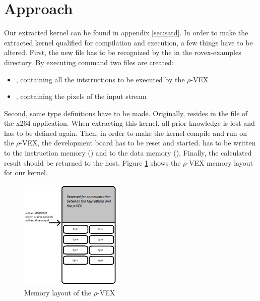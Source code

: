 
\section{Approach}

Our extracted kernel can be found in appendix \ref{sec:satd}. In order to make the extracted kernel qualified for compilation and execution, a few things have to be altered. First, the new file has to be recognized by the  in the rovex-examples directory. By executing  command two files are created:
\begin{itemize}
	\item {}, containing all the intstructions to be executed by the $\rho$-VEX
	\item {}, containing the pixels of the input stream
\end{itemize}

Second, some type definitions have to be made. Originally,  resides in the  file of the x264 application. When extracting this kernel, all prior knowledge is lost and has to be defined again. Then, in order to make the kernel compile and run on the $\rho$-VEX, the development board has to be reset and started.  has to be written to the instruction memory () and  to the data memory (). Finally, the calculated result should be returned to the host. Figure \ref{fig:rvex-dmem} shows the $\rho$-VEX memory layout for our kernel.

\begin{figure}[htb]%
\centering
\includegraphics[height=200px]{Pictures/dmem_rvex}%
\caption{Memory layout of the $\rho$-VEX}%
\label{fig:rvex-dmem}%
\end{figure}


